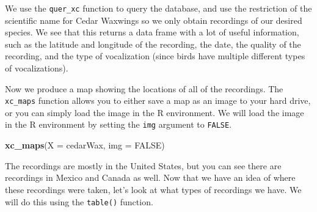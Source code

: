 \documentclass[
]{krantz}
\makeatletter
\newenvironment{Shaded}{\begin{snugshade}}{\end{snugshade}}
\newcommand{\DataTypeTok}[1]{\textcolor[rgb]{0.27,0.27,0.27}{#1}}
\newcommand{\KeywordTok}[1]{\textcolor[rgb]{0.27,0.27,0.27}{\textbf{#1}}}
\newcommand{\NormalTok}[1]{#1}
\newcommand{\OperatorTok}[1]{\textcolor[rgb]{0.43,0.43,0.43}{\textbf{#1}}}
\newcommand{\OtherTok}[1]{\textcolor[rgb]{0.37,0.37,0.37}{#1}}
\newenvironment{kframe}{%
\medskip{}
\setlength{\fboxsep}{.8em}
 \def\at@end@of@kframe{}%
 \ifinner\ifhmode%
  \def\at@end@of@kframe{\end{minipage}}%
  \begin{minipage}{\columnwidth}%
 \fi\fi%
 \def\FrameCommand##1{\hskip\@totalleftmargin \hskip-\fboxsep
 \colorbox{shadecolor}{##1}\hskip-\fboxsep
     \hskip-\linewidth \hskip-\@totalleftmargin \hskip\columnwidth}%
 \MakeFramed {\advance\hsize-\width
   \@totalleftmargin\z@ \linewidth\hsize
   \@setminipage}}%
 {\par\unskip\endMakeFramed%
 \at@end@of@kframe}
\renewenvironment{Shaded}{\begin{kframe}}{\end{kframe}}
\makeatother
\begin{document}
We use the \texttt{quer\_xc} function to query the database, and use the restriction of the scientific name for Cedar Waxwings so we only obtain recordings of our desired species. We see that this returns a data frame with a lot of useful information, such as the latitude and longitude of the recording, the date, the quality of the recording, and the type of vocalization (since birds have multiple different types of vocalizations).

Now we produce a map showing the locations of all of the recordings. The \texttt{xc\_maps} function allows you to either save a map as an image to your hard drive, or you can simply load the image in the R environment. We will load the image in the R environment by setting the \texttt{img} argument to \texttt{FALSE}.

\begin{Shaded}
\begin{Highlighting}[]
\KeywordTok{xc\_maps}\NormalTok{(}\DataTypeTok{X =}\NormalTok{ cedarWax, }\DataTypeTok{img =} \OtherTok{FALSE}\NormalTok{)}
\end{Highlighting}
\end{Shaded}

The recordings are mostly in the United States, but you can see there are recordings in Mexico and Canada as well. Now that we have an idea of where these recordings were taken, let's look at what types of recordings we have. We will do this using the \texttt{table()} function.

\begin{Shaded}
\end{Shaded}
\end{document}
